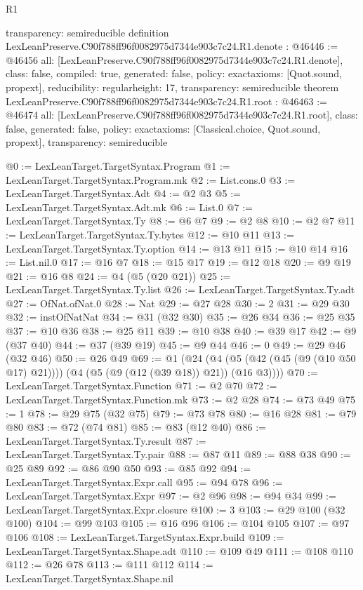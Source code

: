 \begin{lexlean}{R1}
\begin{coremodule}
{  transparency: semireducible
}
definition LexLeanPreserve.C90f788ff96f0082975d7344e903c7c24.R1.denote : @46446 := @46456 {
  all: [LexLeanPreserve.C90f788ff96f0082975d7344e903c7c24.R1.denote],
  class: false,
  compiled: true,
  generated: false,
  policy: exact{axioms: [Quot.sound, propext]},
  reducibility: regular{height: 17},
  transparency: semireducible
}
theorem LexLeanPreserve.C90f788ff96f0082975d7344e903c7c24.R1.root : @46463 := @46474 {
  all: [LexLeanPreserve.C90f788ff96f0082975d7344e903c7c24.R1.root],
  class: false,
  generated: false,
  policy: exact{axioms: [Classical.choice, Quot.sound, propext]},
  transparency: semireducible
}

@0 := LexLeanTarget.TargetSyntax.Program
@1 := LexLeanTarget.TargetSyntax.Program.mk
@2 := List.cons.{0}
@3 := LexLeanTarget.TargetSyntax.Adt
@4 := @2 @3
@5 := LexLeanTarget.TargetSyntax.Adt.mk
@6 := List.{0}
@7 := LexLeanTarget.TargetSyntax.Ty
@8 := @6 @7
@9 := @2 @8
@10 := @2 @7
@11 := LexLeanTarget.TargetSyntax.Ty.bytes
@12 := @10 @11
@13 := LexLeanTarget.TargetSyntax.Ty.option
@14 := @13 @11
@15 := @10 @14
@16 := List.nil.{0}
@17 := @16 @7
@18 := @15 @17
@19 := @12 @18
@20 := @9 @19
@21 := @16 @8
@24 := @4 (@5 (@20 @21))
@25 := LexLeanTarget.TargetSyntax.Ty.list
@26 := LexLeanTarget.TargetSyntax.Ty.adt
@27 := OfNat.ofNat.{0}
@28 := Nat
@29 := @27 @28
@30 := 2
@31 := @29 @30
@32 := instOfNatNat
@34 := @31 (@32 @30)
@35 := @26 @34
@36 := @25 @35
@37 := @10 @36
@38 := @25 @11
@39 := @10 @38
@40 := @39 @17
@42 := @9 (@37 @40)
@44 := @37 (@39 @19)
@45 := @9 @44
@46 := 0
@49 := @29 @46 (@32 @46)
@50 := @26 @49
@69 := @1
    (@24 (@4 (@5 (@42 (@45 (@9 (@10 @50 @17) @21)))) (@4 (@5 (@9 (@12 (@39 @18)) @21)) (@16 @3))))
@70 := LexLeanTarget.TargetSyntax.Function
@71 := @2 @70
@72 := LexLeanTarget.TargetSyntax.Function.mk
@73 := @2 @28
@74 := @73 @49
@75 := 1
@78 := @29 @75 (@32 @75)
@79 := @73 @78
@80 := @16 @28
@81 := @79 @80
@83 := @72 (@74 @81)
@85 := @83 (@12 @40)
@86 := LexLeanTarget.TargetSyntax.Ty.result
@87 := LexLeanTarget.TargetSyntax.Ty.pair
@88 := @87 @11
@89 := @88 @38
@90 := @25 @89
@92 := @86 @90 @50
@93 := @85 @92
@94 := LexLeanTarget.TargetSyntax.Expr.call
@95 := @94 @78
@96 := LexLeanTarget.TargetSyntax.Expr
@97 := @2 @96
@98 := @94 @34
@99 := LexLeanTarget.TargetSyntax.Expr.closure
@100 := 3
@103 := @29 @100 (@32 @100)
@104 := @99 @103
@105 := @16 @96
@106 := @104 @105
@107 := @97 @106
@108 := LexLeanTarget.TargetSyntax.Expr.build
@109 := LexLeanTarget.TargetSyntax.Shape.adt
@110 := @109 @49
@111 := @108 @110
@112 := @26 @78
@113 := @111 @112
@114 := LexLeanTarget.TargetSyntax.Shape.nil

\end{coremodule}
\end{lexlean}
